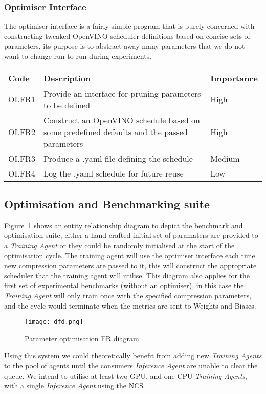 \documentclass[../../D1.tex]{subfiles}
\begin{document}
\subsubsection{Optimiser Interface}
The optimiser interface is a fairly simple program that is purely concerned with constructing tweaked OpenVINO scheduler definitions based on concise sets of parameters, its purpose is to abstract away many parameters that we do not want to change run to run during experiments.
\begin{table}[h]
    \begin{tabular}{@{}l|p{10cm}|l@{}}
    \toprule
    Code   & Description                                                                                & Importance \\ \midrule
    OI.FR1 & Provide an interface for pruning parameters to be defined                                  & High       \\
    OI.FR2 & Construct an OpenVINO schedule based on some predefined defaults and the passed parameters & High       \\
    OI.FR3 & Produce a .yaml file defining the schedule                                                 & Medium     \\
    OI.FR4 & Log the .yaml schedule for future reuse                                                    & Low        \\ \bottomrule
    \end{tabular}
\end{table}


\subsection{Optimisation and Benchmarking suite}\label{sec:ERdiagram}

Figure~\ref{fig:benchcycle} shows an entity relationship diagram to depict the benchmark and optimisation suite, either a hand crafted initial set of paramaters are provided to a \emph{Training Agent} or they could be randomly initialised at the start of the optimisation cycle.
The training agent will use the optimiser interface each time new compression parameters are passed to it, this will construct the appropriate scheduler that the training agent will utilise.
This diagram also applies for the first set of experimental benchmarks (without an optimiser), in this case the \emph{Training Agent} will only train once with the specified compression parameters, and the cycle would terminate when the metrics are sent to Weights and Biases.

\begin{figure}[H]
    \texttt{[image: dfd.png]}
    \caption{Parameter optimisation ER diagram}
    \label{fig:benchcycle}
\end{figure}

Using this system we could theoretically benefit from adding new \emph{Training Agents} to the pool of agents until the consumers \emph{Inference Agent} are unable to clear the queue.
We intend to utilise at least two GPU, and one CPU \emph{Training Agents}, with a single \emph{Inference Agent} using the NCS
\end{document}
